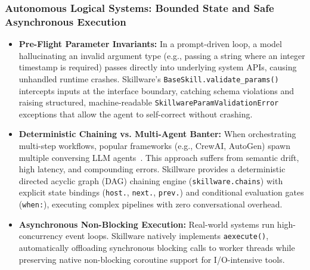 \subsubsection{Autonomous Logical Systems: Bounded State and Safe Asynchronous Execution}
\begin{itemize}[leftmargin=*]
  \item \textbf{Pre-Flight Parameter Invariants:} In a prompt-driven loop, a model hallucinating an invalid argument type (e.g., passing a string where an integer timestamp is required) passes directly into underlying system APIs, causing unhandled runtime crashes. Skillware's \texttt{BaseSkill.\allowbreak validate\_params()} intercepts inputs at the interface boundary, catching schema violations and raising structured, machine-readable \texttt{Skillware\allowbreak Param\allowbreak Validation\allowbreak Error} exceptions that allow the agent to self-correct without crashing.
  \item \textbf{Deterministic Chaining vs. Multi-Agent Banter:} When orchestrating multi-step workflows, popular frameworks (e.g., CrewAI, AutoGen) spawn multiple conversing LLM agents~\cite{wu2023autogen, mourato2023crewai}. This approach suffers from semantic drift, high latency, and compounding errors. Skillware provides a deterministic directed acyclic graph (DAG) chaining engine (\texttt{skillware.chains}) with explicit state bindings (\texttt{host.}, \texttt{next.}, \texttt{prev.}) and conditional evaluation gates (\texttt{when:}), executing complex pipelines with zero conversational overhead.
  \item \textbf{Asynchronous Non-Blocking Execution:} Real-world systems run high-concurrency event loops. Skillware natively implements \texttt{aexecute()}, automatically offloading synchronous blocking calls to worker threads while preserving native non-blocking coroutine support for I/O-intensive tools.
\end{itemize}

